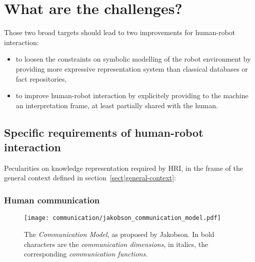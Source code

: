 

\section{What are the challenges?}
\label{sect|scenario-challenges}

Those two broad targets should lead to two improvements for human-robot
interaction:


\begin{itemize}
	\item to loosen the constraints on symbolic modelling of the robot
	environment by providing more expressive representation system than
	classical databases or fact repositories,

	\item to improve human-robot interaction by explicitely providing to the
	machine an interpretation frame, at least partially shared with the human.

\end{itemize}



\subsection{Specific requirements of human-robot interaction}
\label{sect|pecularities-krs-for-hri}

Pecularities on knowledge representation required by HRI, in the frame of the
general context defined in section~\ref{sect|general-context}:

\subsubsection{Human communication}

\begin{figure}%
\centering
  \texttt{[image: communication/jakobson\_communication\_model.pdf]}
  \caption{The \emph{Communication Model}, as proposed by Jakobson. In bold
  characters are the \emph{communication dimensions}, in italics, the
  corresponding \emph{communication functions}.}
  \label{fig|jakobson_communication_model}
\end{figure}

